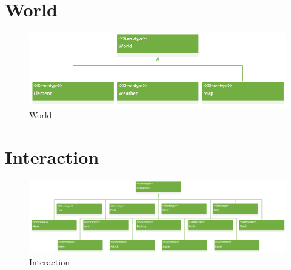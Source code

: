 \section{World}
\begin{figure}[H]
    \begin{center}
    \includegraphics[width=14cm]{10_img/Z_annexeA/world.PNG} 
    \caption{World}
    \label{A-World}
    \end{center}
\end{figure}


\section{Interaction}
\begin{figure}[H]
    \begin{center}
    \includegraphics[width=\linewidth]{10_img/Z_annexeA/interaction.PNG} 
    \caption{Interaction}
    \label{A-Interaction}
    \end{center}
\end{figure}